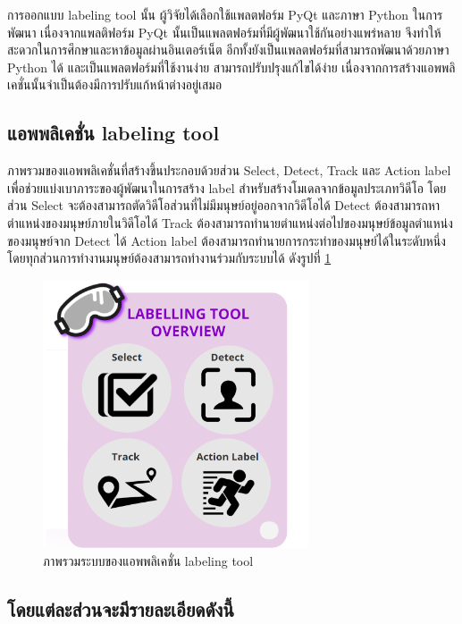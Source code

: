 การออกแบบ labeling tool นั้น ผู้วิจัยได้เลือกใช้แพลตฟอร์ม PyQt และภาษา Python ในการพัฒนา
เนื่องจากแพลติฟอร์ม PyQt นั้นเป็นแพลตฟอร์มที่มีผู้พัฒนาใช้กันอย่างแพร่หลาย จึงทำให้สะดวกในการศึกษาและหาข้อมูลผ่านอินเตอร์เน็ต
อีกทั้งยังเป็นแพลตฟอร์มที่สามารถพัฒนาด้วยภาษา Python ได้ และเป็นแพลตฟอร์มที่ใช้งานง่าย สามารถปรับปรุงแก้ไขได้ง่าย
เนื่องจากการสร้างแอพพลิเคชั่นนั้นจำเป็นต้องมีการปรับแก้หน้าต่างอยู่เสมอ

\subsection{แอพพลิเคชั่น labeling tool}
ภาพรวมของแอพพลิเคชั่นที่สร้างขึ้นประกอบด้วยส่วน Select, Detect, Track และ Action label
เพื่อช่วยแบ่งเบาภาระของผู้พัฒนาในการสร้าง label สำหรับสร้างโมเดลจากข้อมูลประเภทวิดีโอ โดยส่วน Select
จะต้องสามารถตัดวิดีโอส่วนที่ไม่มีมนุษย์อยู่ออกจากวิดีโอได้ Detect ต้องสามารถหาตำแหน่งของมนุษย์ภายในวิดีโอได้
Track ต้องสามารถทำนายตำแหน่งต่อไปของมนุษย์ข้อมูลตำแหน่งของมนุษย์จาก Detect ได้
Action label ต้องสามารถทำนายการกระทำของมนุษย์ได้ในระดับหนึ่ง โดยทุกส่วนการทำงานมนุษย์ต้องสามารถทำงานร่วมกับระบบได้
ดังรูปที่ \ref{fig:labeling_overview}

\begin{figure}[!ht]
    \centering
    \includegraphics[width=0.7\textwidth]{chapter3/images/3_3/labelingToolOverview.png}
    \caption{ภาพรวมระบบของแอพพลิเคชั่น labeling tool}
    \label{fig:labeling_overview}
\end{figure}

\clearpage
\subsection*{โดยแต่ละส่วนจะมีรายละเอียดดังนี้}
